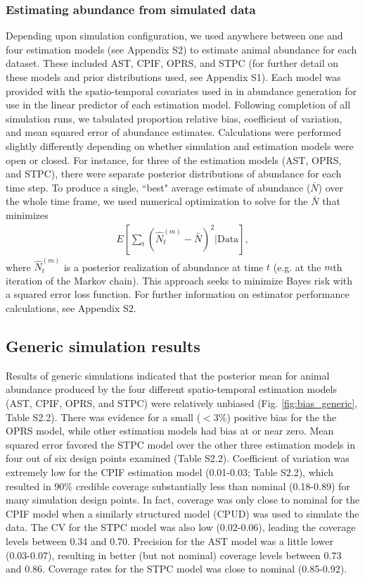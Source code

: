 \documentclass[times,mee,doublespace,]{besauth2}
\begin{document}
\subsubsection{Estimating abundance from simulated data}

Depending upon simulation configuration, we used anywhere between one and four estimation models (see Appendix S2) to estimate animal abundance for each dataset.  These included AST, CPIF, OPRS, and STPC (for further detail on these models and prior distributions used, see Appendix S1).  Each model was provided with the spatio-temporal covariates used in in abundance generation for use in the linear predictor of each estimation model.  Following completion of all simulation runs, we tabulated proportion relative bias, coefficient of variation, and mean squared error of abundance estimates.  Calculations were performed slightly differently depending on whether simulation and estimation models were open or closed.  For instance, for three of the estimation models (AST, OPRS, and STPC), there were separate posterior distributions of abundance for each time step.  To produce a single, ``best" average estimate of abundance ($\bar{N}$) over the whole time frame,
we used numerical optimization to solve for the $\bar{N}$ that minimizes
\begin{eqnarray*}
  E \left[ \sum_t (\hat{N}_t^{(m)} - \bar{N})^2 | \text{Data} \right],
\end{eqnarray*}
where $\hat{N}_t^{(m)}$ is a posterior realization of abundance at time $t$ (e.g. at the $m$th iteration of the Markov chain).  This approach seeks to minimize Bayes risk with a squared error loss function.  For further information on estimator performance calculations, see Appendix S2.

\subsection{Generic simulation results}

Results of generic simulations indicated that the posterior mean for animal abundance produced by the four different spatio-temporal estimation models (AST, CPIF, OPRS, and STPC) were relatively unbiased (Fig. \ref{fig:bias_generic}, Table S2.2).  There was evidence for a small ($<3\%$)  positive bias for the the OPRS model, while other estimation models had bias at or near zero.  Mean squared error favored the STPC model over the other three estimation models in four out of six design points examined (Table S2.2).  Coefficient of variation was extremely low for the CPIF estimation model (0.01-0.03; Table S2.2), which resulted in 90\% credible coverage substantially less than nominal (0.18-0.89) for many simulation design points.  In fact, coverage was only close to nominal for the CPIF model when a similarly structured model (CPUD) was used to simulate the data.  The CV for the STPC model was also low (0.02-0.06), leading the coverage levels between 0.34 and 0.70.  Precision for the AST model was a little lower (0.03-0.07), resulting in better (but not nominal) coverage levels between 0.73 and 0.86.  Coverage rates for the STPC model was close to nominal (0.85-0.92).
\end{document}
